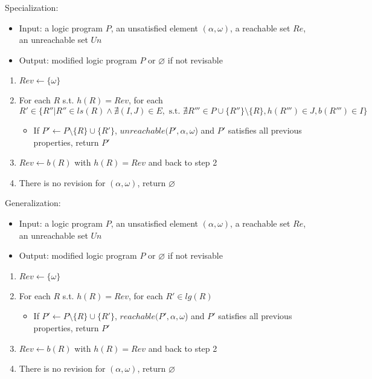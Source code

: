    \noindent
    \begin{minipage}{\linewidth}
    \vspace{1em}
    Specialization:
    \begin{itemize}
        \item Input: a logic program $P$, an unsatisfied element $(\alpha,\omega)$, a reachable set $Re$, an unreachable set $Un$%
        \item Output: modified logic program $P$ or $\varnothing$ if not revisable
    \end{itemize}
    \begin{enumerate}
        \item $Rev\gets\{\omega\}$
        \item For each $R$ s.t. $h(R)=Rev$, for each $R'\in\{R''|R''\in ls(R)\land \nexists (I,J)\in E, \text{ s.t. } \nexists R'''\in P\cup \{R''\}\setminus \{R\}, h(R''')\in J, b(R''')\in I\}$
        \begin{itemize}
            \item If $P' \gets P \setminus \{R\} \cup \{R'\}$, $unreachable(P',\alpha,\omega$) and $P'$ satisfies all previous properties, return $P'$
        \end{itemize}
        \item $Rev\gets b(R)$ with $h(R)=Rev$ and back to step 2
        \item There is no revision for $(\alpha,\omega)$, return $\varnothing$
    \end{enumerate}
    \end{minipage}
    \noindent
    \begin{minipage}{\linewidth}
    \vspace{1em}
    Generalization:
    \begin{itemize}
        \item Input: a logic program $P$, an unsatisfied element $(\alpha,\omega)$, a reachable set $Re$, an unreachable set $Un$
        \item Output: modified logic program $P$ or $\varnothing$ if not revisable
    \end{itemize}
    \begin{enumerate}
        \item $Rev\gets\{\omega\}$
        \item For each $R$ s.t. $h(R)=Rev$, for each $R'\in lg(R)$
        \begin{itemize}
            \item If $P' \gets P \setminus \{R\} \cup \{R'\}$, $reachable(P',\alpha,\omega$) and $P'$ satisfies all previous properties, return $P'$
        \end{itemize}
        \item $Rev\gets b(R)$ with $h(R)=Rev$ and back to step 2
        \item There is no revision for $(\alpha,\omega)$, return $\varnothing$
    \end{enumerate}
    \vspace{0.1em}
    \end{minipage}
